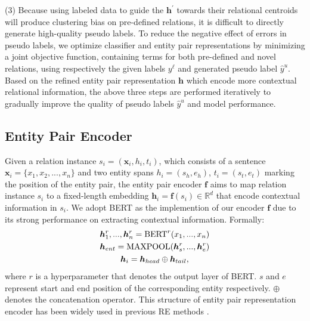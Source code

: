 \documentclass[11pt]{article}
\begin{document}
        \noindent(3) Because using labeled data to guide the $\bm{h^\prime}$ towards their relational centroids will produce clustering bias on pre-defined relations, it is difficult to directly generate high-quality pseudo labels. To reduce the negative effect of errors in pseudo labels, we optimize classifier and entity pair representations by minimizing a joint objective function, containing terms for both pre-defined and novel relations, using respectively the given labels $y^\ell$ and generated pseudo label $\hat{y}^u$. Based on the refined entity pair representation $\bm{h}$ which encode more contextual relational information, the above three steps are performed iteratively to gradually improve the quality of pseudo labels $\hat{y}^u$ and model performance.
        
        \subsection{Entity Pair Encoder}
        Given a relation instance $s_i=(\bm{x}_i,h_i, t_i)$, which consists of a sentence $\bm{x}_i=\{x_1,x_2,...,x_n\}$ and two entity spans $h_i=(s_h,e_h)$, $t_i=(s_t,e_t)$ marking the position of the entity pair, the entity pair encoder $\bm{f}$ aims to map relation instance $s_i$ to a fixed-length embedding $\bm{h}_i=\bm{f}(s_i) \in \mathbb{R}^d$ that encode contextual information in $s_i$. We adopt BERT \citep{DBLP:journals/corr/abs-1810-04805} as the implemention of our encoder $\bm{f}$ due to its strong performance on extracting contextual information. Formally:
        \begin{gather}
            \bm{h}_1^r,...,\bm{h}_n^r={\rm BERT}^r(x_1,...,x_n)\\
            \bm{h}_{ent}={\rm MAXPOOL}(\bm{h}_s^r,...,\bm{h}_e^r)\\     
            \bm{h}_i=\bm{h}_{head}\oplus\bm{h}_{tail},
        \end{gather}
        where $r$ is a hyperparameter that denotes the output layer of BERT. $s$ and $e$ represent start and end position of the corresponding entity respectively. $\oplus$ denotes the concatenation operator. This structure of entity pair representation encoder has been widely used in previous RE methods \citep{wang-etal-2021-enpar,hu2020selfore}.
        
        
\end{document}
